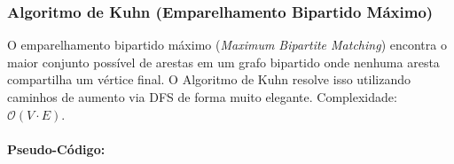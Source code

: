 \subsubsection{Algoritmo de Kuhn (Emparelhamento Bipartido Máximo)}
O emparelhamento bipartido máximo (\textit{Maximum Bipartite Matching})
encontra o maior conjunto possível de arestas em um grafo bipartido onde
nenhuma aresta compartilha um vértice final. O Algoritmo de Kuhn resolve isso
utilizando caminhos de aumento via DFS de forma muito elegante. Complexidade:
$\mathcal{O}(V \cdot E)$.

\paragraph{Pseudo-Código: }\mbox{}\\
\begin{algorithm}[H]
    \SetAlgoLined

    \caption{Algoritmo de Kuhn para Emparelhamento Bipartido}
\end{algorithm}


